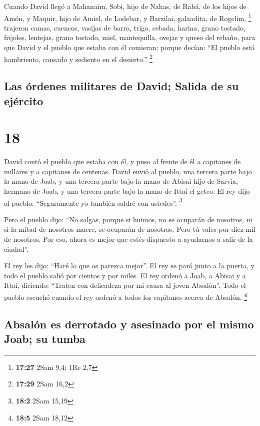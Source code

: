  Cuando David llegó a Mahanaim, Sobi, hijo de Nahas, de
Rabá, de los hijos de Amón, y Maquir, hijo de Amiel, de Lodebar, y
Barzilai, galaadita, de Rogelim, \footnote{\textbf{17:27} 2Sam 9,4; 1Re
  2,7}  trajeron camas, cuencos, vasijas de barro, trigo,
cebada, harina, grano tostado, frijoles, lentejas, grano tostado,
 miel, mantequilla, ovejas y queso del rebaño, para que
David y el pueblo que estaba con él comieran; porque decían: ``El pueblo
está hambriento, cansado y sediento en el desierto.'' \footnote{\textbf{17:29}
  2Sam 16,2}

\hypertarget{las-uxf3rdenes-militares-de-david-salida-de-su-ejuxe9rcito}{%
\subsection{Las órdenes militares de David; Salida de su
ejército}\label{las-uxf3rdenes-militares-de-david-salida-de-su-ejuxe9rcito}}

\hypertarget{section-17}{%
\section{18}\label{section-17}}

 David contó el pueblo que estaba con él, y puso al frente
de él a capitanes de millares y a capitanes de centenas. 
David envió al pueblo, una tercera parte bajo la mano de Joab, y una
tercera parte bajo la mano de Abisai hijo de Sarvia, hermano de Joab, y
una tercera parte bajo la mano de Ittai el geteo. El rey dijo al pueblo:
``Seguramente yo también saldré con ustedes''. \footnote{\textbf{18:2}
  2Sam 15,19}

 Pero el pueblo dijo: ``No salgas, porque si huimos, no se
ocuparán de nosotros, ni si la mitad de nosotros muere, se ocuparán de
nosotros. Pero tú vales por diez mil de nosotros. Por eso, ahora es
mejor que estés dispuesto a ayudarnos a salir de la ciudad''.

 El rey les dijo: ``Haré lo que os parezca mejor''. El rey
se paró junto a la puerta, y todo el pueblo salió por cientos y por
miles.  El rey ordenó a Joab, a Abisai y a Ittai,
diciendo: ``Traten con delicadeza por mi causa al joven Absalón''. Todo
el pueblo escuchó cuando el rey ordenó a todos los capitanes acerca de
Absalón. \footnote{\textbf{18:5} 2Sam 18,12}

\hypertarget{absaluxf3n-es-derrotado-y-asesinado-por-el-mismo-joab-su-tumba}{%
\subsection{Absalón es derrotado y asesinado por el mismo Joab; su
tumba}\label{absaluxf3n-es-derrotado-y-asesinado-por-el-mismo-joab-su-tumba}}

